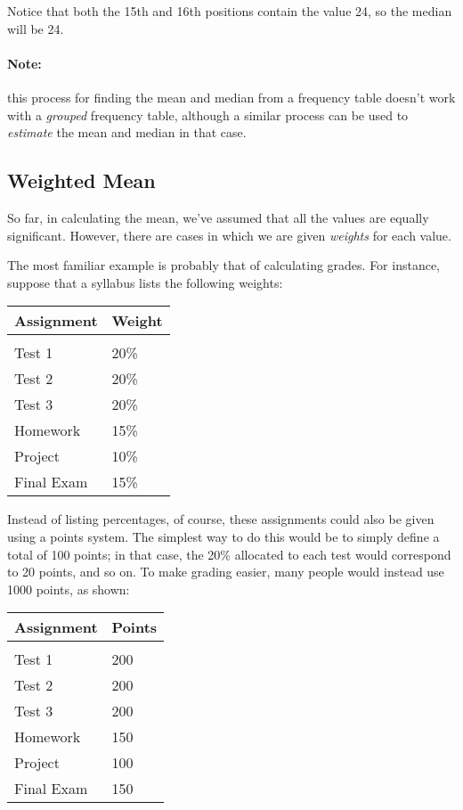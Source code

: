 Notice that both the 15th and 16th positions contain the value 24, so the median will be 24.

\paragraph{Note:} this process for finding the mean and median from a frequency table doesn't work with a \emph{grouped} frequency table, although a similar process can be used to \emph{estimate} the mean and median in that case.
\vfill
\pagebreak

\subsection{Weighted Mean}
So far, in calculating the mean, we've assumed that all the values are equally significant.  However, there are cases in which we are given \emph{weights} for each value.

The most familiar example is probably that of calculating grades.  For instance, suppose that a syllabus lists the following weights:
\begin{center}
\begin{tabular}{l l}
\textbf{Assignment} & \textbf{Weight}\\
\hline
& \\
Test 1 & 20\%\\
Test 2 & 20\%\\
Test 3 & 20\%\\
Homework & 15\%\\
Project & 10\%\\
Final Exam & 15\%
\end{tabular}
\end{center}

Instead of listing percentages, of course, these assignments could also be given using a points system.  The simplest way to do this would be to simply define a total of 100 points; in that case, the 20\% allocated to each test would correspond to 20 points, and so on.  To make grading easier, many people would instead use 1000 points, as shown:
\begin{center}
\begin{tabular}{l l}
\textbf{Assignment} & \textbf{Points}\\
\hline
& \\
Test 1 & 200\\
Test 2 & 200\\
Test 3 & 200\\
Homework & 150\\
Project & 100\\
Final Exam & 150
\end{tabular}
\end{center}

